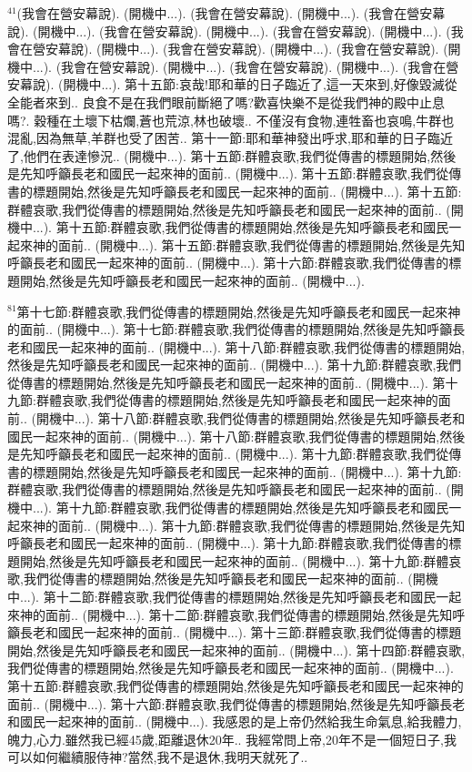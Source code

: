 \documentclass{book}
\begin{document}
$^{41}$(我會在營安幕說).
(開機中...).
(我會在營安幕說).
(開機中...).
(我會在營安幕說).
(開機中...).
(我會在營安幕說).
(開機中...).
(我會在營安幕說).
(開機中...).
(我會在營安幕說).
(開機中...).
(我會在營安幕說).
(開機中...).
(我會在營安幕說).
(開機中...).
(我會在營安幕說).
(開機中...).
(我會在營安幕說).
(開機中...).
(我會在營安幕說).
(開機中...).
第十五節:哀哉!耶和華的日子臨近了,這一天來到,好像毀滅從全能者來到..
良食不是在我們眼前斷絕了嗎?歡喜快樂不是從我們神的殿中止息嗎?.
穀種在土壞下枯爛,蒼也荒涼,林也破壞..
不僅沒有食物,連牲畜也哀鳴,牛群也混亂,因為無草,羊群也受了困苦..
第十一節:耶和華神發出呼求,耶和華的日子臨近了,他們在表達慘況..
(開機中...).
第十五節:群體哀歌,我們從傳書的標題開始,然後是先知呼籲長老和國民一起來神的面前..
(開機中...).
第十五節:群體哀歌,我們從傳書的標題開始,然後是先知呼籲長老和國民一起來神的面前..
(開機中...).
第十五節:群體哀歌,我們從傳書的標題開始,然後是先知呼籲長老和國民一起來神的面前..
(開機中...).
第十五節:群體哀歌,我們從傳書的標題開始,然後是先知呼籲長老和國民一起來神的面前..
(開機中...).
第十五節:群體哀歌,我們從傳書的標題開始,然後是先知呼籲長老和國民一起來神的面前..
(開機中...).
第十六節:群體哀歌,我們從傳書的標題開始,然後是先知呼籲長老和國民一起來神的面前..
(開機中...).

$^{81}$第十七節:群體哀歌,我們從傳書的標題開始,然後是先知呼籲長老和國民一起來神的面前..
(開機中...).
第十七節:群體哀歌,我們從傳書的標題開始,然後是先知呼籲長老和國民一起來神的面前..
(開機中...).
第十八節:群體哀歌,我們從傳書的標題開始,然後是先知呼籲長老和國民一起來神的面前..
(開機中...).
第十九節:群體哀歌,我們從傳書的標題開始,然後是先知呼籲長老和國民一起來神的面前..
(開機中...).
第十九節:群體哀歌,我們從傳書的標題開始,然後是先知呼籲長老和國民一起來神的面前..
(開機中...).
第十八節:群體哀歌,我們從傳書的標題開始,然後是先知呼籲長老和國民一起來神的面前..
(開機中...).
第十八節:群體哀歌,我們從傳書的標題開始,然後是先知呼籲長老和國民一起來神的面前..
(開機中...).
第十九節:群體哀歌,我們從傳書的標題開始,然後是先知呼籲長老和國民一起來神的面前..
(開機中...).
第十九節:群體哀歌,我們從傳書的標題開始,然後是先知呼籲長老和國民一起來神的面前..
(開機中...).
第十九節:群體哀歌,我們從傳書的標題開始,然後是先知呼籲長老和國民一起來神的面前..
(開機中...).
第十九節:群體哀歌,我們從傳書的標題開始,然後是先知呼籲長老和國民一起來神的面前..
(開機中...).
第十九節:群體哀歌,我們從傳書的標題開始,然後是先知呼籲長老和國民一起來神的面前..
(開機中...).
第十九節:群體哀歌,我們從傳書的標題開始,然後是先知呼籲長老和國民一起來神的面前..
(開機中...).
第十二節:群體哀歌,我們從傳書的標題開始,然後是先知呼籲長老和國民一起來神的面前..
(開機中...).
第十二節:群體哀歌,我們從傳書的標題開始,然後是先知呼籲長老和國民一起來神的面前..
(開機中...).
第十三節:群體哀歌,我們從傳書的標題開始,然後是先知呼籲長老和國民一起來神的面前..
(開機中...).
第十四節:群體哀歌,我們從傳書的標題開始,然後是先知呼籲長老和國民一起來神的面前..
(開機中...).
第十五節:群體哀歌,我們從傳書的標題開始,然後是先知呼籲長老和國民一起來神的面前..
(開機中...).
第十六節:群體哀歌,我們從傳書的標題開始,然後是先知呼籲長老和國民一起來神的面前..
(開機中...).
我感恩的是上帝仍然給我生命氣息,給我體力,魄力,心力.雖然我已經45歲,距離退休20年..
我經常問上帝,20年不是一個短日子,我可以如何繼續服侍神?當然,我不是退休,我明天就死了..
\end{document}
